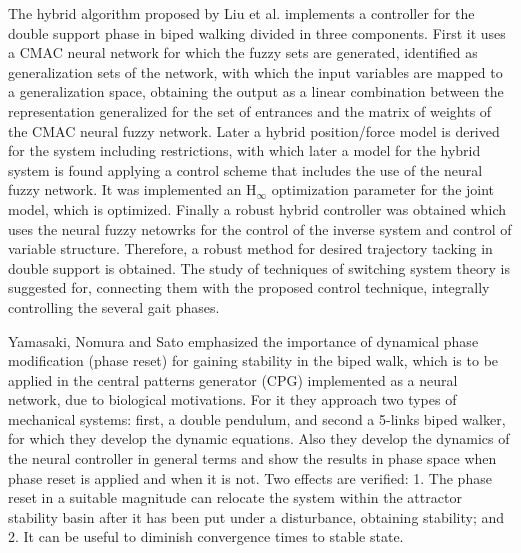The hybrid algorithm proposed by Liu et al. \cite{Liu03Hybrid}
implements a controller for the double support phase in biped walking
divided in three components. First it uses a CMAC neural network for
which the fuzzy sets are generated, identified as generalization sets
of the network, with which the input variables are mapped to a
generalization space, obtaining the output as a linear combination
between the representation generalized for the set of entrances and
the matrix of weights of the CMAC neural fuzzy network. Later a hybrid
position/force model is derived for the system including restrictions,
with which later a model for the hybrid system is found applying a
control scheme that includes the use of the neural fuzzy network. It
was implemented an H$_\infty$ optimization parameter for the joint
model, which is optimized. Finally a robust hybrid controller was
obtained which uses the neural fuzzy netowrks for the control of the
inverse system and control of variable structure.  Therefore, a robust
method for desired trajectory tacking in double support is
obtained. The study of techniques of switching system theory is
suggested for, connecting them with the proposed control technique,
integrally controlling the several gait phases.


Yamasaki, Nomura and Sato \cite{Yamasaki03Possible} emphasized the
importance of dynamical phase modification (phase reset) for gaining
stability in the biped walk, which is to be applied in the central
patterns generator (CPG) implemented as a neural network, due to
biological motivations. For it they approach two types of mechanical
systems: first, a double pendulum, and second a 5-links biped walker,
for which they develop the dynamic equations. Also they develop the
dynamics of the neural controller in general terms and show the
results in phase space when phase reset is applied and when it is
not. Two effects are verified: 1. The phase reset in a suitable
magnitude can relocate the system within the attractor stability basin
after it has been put under a disturbance, obtaining stability; and
2. It can be useful to diminish convergence times to stable state.


